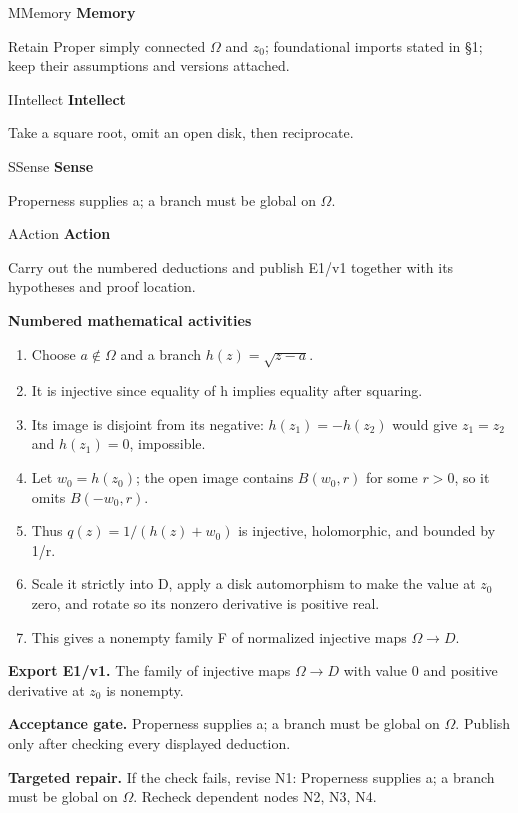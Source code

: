 \documentclass[preprint,12pt,aps,pra,showkeys,amsmath,amssymb,superscriptaddress,floatfix]{revtex4-2}
\theoremstyle{definition}
\theoremstyle{remark}
\newcommand{\mmfaculty}[3]{%
 \begin{mmfacultybox}{#1}{#2}
 {\sffamily\bfseries\color{MMBlue}#2}\par\smallskip #3
 \end{mmfacultybox}}
\newcommand{\field}[2]{\par\smallskip\noindent\textbf{#1.} #2\par}
\begin{document}
\mmfaculty{M}{Memory}{Retain Proper simply connected \(\Omega\) and \(z_{0}\); foundational
imports stated in §1; keep their assumptions and versions attached.}

\mmfaculty{I}{Intellect}{Take a square root, omit an open disk, then reciprocate.}

\mmfaculty{S}{Sense}{Properness supplies a; a branch must be global on \(\Omega\).}

\mmfaculty{A}{Action}{Carry out the numbered deductions and publish E1/v1 together with its
hypotheses and proof location.}

\smallskip\noindent\textbf{Numbered mathematical activities}

\begin{enumerate}[label=N1.\arabic*,leftmargin=3.4em]

\item Choose \(a\notin \Omega\) and a branch \(h(z)=\sqrt{z-a}\).

\item It is injective since equality of h implies equality after squaring.

\item Its image is disjoint from its negative: \(h(z_{1})=-h(z_{2})\) would
give \(z_{1}=z_{2}\) and \(h(z_{1})=0\), impossible.

\item Let \(w_{0}=h(z_{0})\); the open image contains \(B(w_{0},r)\) for some
\(r>0\), so it omits \(B(-w_{0},r)\).

\item Thus \(q(z)=1/(h(z)+w_{0})\) is injective, holomorphic, and bounded by
1/r.

\item Scale it strictly into D, apply a disk automorphism to make the value at
\(z_{0}\) zero, and rotate so its nonzero derivative is positive real.

\item This gives a nonempty family F of normalized injective maps
\(\Omega \to D\).

\end{enumerate}

\field{Export E1/v1}{The family of injective maps \(\Omega \to D\) with value 0 and positive
derivative at \(z_{0}\) is nonempty.}

\field{Acceptance gate}{Properness supplies a; a branch must be global on \(\Omega\). Publish
only after checking every displayed deduction.}

\field{Targeted repair}{If the check fails, revise N1: Properness supplies a; a branch must be
global on \(\Omega\). Recheck dependent nodes N2, N3, N4.}
\end{document}

